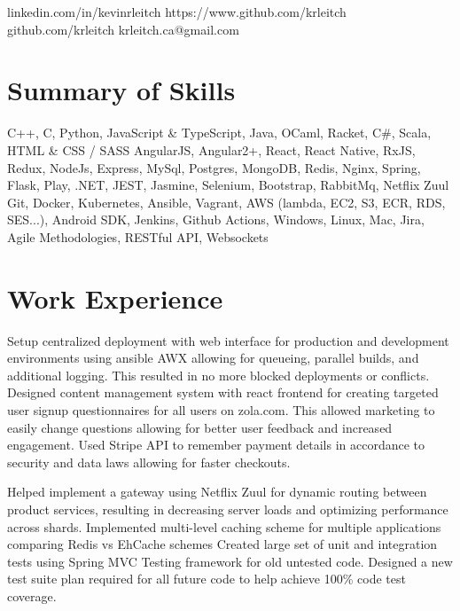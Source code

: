 \documentclass{my_resume}
\begin{document}
        {linkedin.com/in/kevinrleitch}
        {https://www.github.com/krleitch}
        {github.com/krleitch}
        {krleitch.ca@gmail.com}

\section{Summary of Skills}
{C++, C, Python, JavaScript \& TypeScript, Java, OCaml, Racket, C\#, Scala, HTML \& CSS / SASS}
{AngularJS, Angular2+, React, React Native, RxJS, Redux, NodeJs, Express, MySql, Postgres,
 MongoDB, Redis, Nginx, Spring, Flask, Play, .NET, JEST, Jasmine, Selenium, Bootstrap, RabbitMq, Netflix Zuul}
{Git, Docker, Kubernetes, Ansible, Vagrant, AWS (lambda, EC2, S3, ECR, RDS, SES...),
 Android SDK, Jenkins, Github Actions, Windows, Linux, Mac, Jira, Agile Methodologies, RESTful API, Websockets}

\section{Work Experience}

\workitemsthree
{Setup centralized deployment with web interface for production and development environments using ansible AWX allowing for queueing,
 parallel builds, and additional logging. This resulted in no more blocked deployments or conflicts.}
{Designed content management system with react frontend for creating targeted user signup questionnaires for all users on zola.com. This allowed marketing
 to easily change questions allowing for better user feedback and increased engagement.}
{Used Stripe API to remember payment details in accordance to security and data laws allowing for faster checkouts.}

\workitemsthree
{Helped implement a gateway using Netflix Zuul for dynamic routing between product services,
 resulting in decreasing server loads and optimizing performance across shards.}
{Implemented multi-level caching scheme for multiple applications comparing Redis vs EhCache schemes}
{Created large set of unit and integration tests using Spring MVC Testing framework for old untested code.
 Designed a new test suite plan required for all future code to help achieve 100\% code test coverage.}
\end{document}
